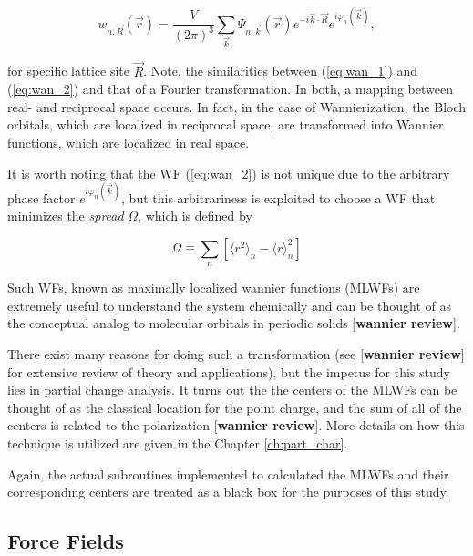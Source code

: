     \begin{equation}
    \label{eq:wan_2}
        w_{n,\vec{R}}(\Vec{r}) = \frac{V}{(2\pi)^3} \sum\limits_{\Vec{k}}  \Psi_{n,\vec{k}}(\Vec{r}) e^{-i\Vec{k}\cdot\Vec{R}} e^{i\varphi_n(\vec{k})},
    \end{equation}
    
    \noindent for specific lattice site $\vec{R}$. Note, the similarities between (\ref{eq:wan_1}) and (\ref{eq:wan_2}) and that of a Fourier transformation. In both, a mapping between real- and reciprocal space occurs. In fact, in the case of Wannierization, the Bloch orbitals, which are localized in reciprocal space, are transformed into Wannier functions, which are localized in real space.
    
    It is worth noting that the WF (\ref{eq:wan_2}) is not unique due to the arbitrary phase factor $e^{i\varphi_n(\vec{k})}$, but this arbitrariness is exploited to choose a WF that minimizes the \textit{spread} $\Omega$, which is defined by
    
    \begin{equation}
        \Omega \equiv \sum\limits_n \left[ \langle r^2 \rangle_n - \langle r \rangle^2_n \right]
    \end{equation}
    
    \noindent Such WFs, known as maximally localized wannier functions (MLWFs) are extremely useful to understand the system chemically and can be thought of as the conceptual analog to molecular orbitals in periodic solids [\textbf{wannier review}].
    
    
    There exist many reasons for doing such a transformation (see [\textbf{wannier review}] for extensive review of theory and applications), but the impetus for this study lies in partial change analysis. It turns out the the centers of the MLWFs can be thought of as the classical location for the point charge, and the sum of all of the centers is related to the polarization [\textbf{wannier review}]. More details on how this technique is utilized are given in the Chapter \ref{ch:part_char}.
    
    Again, the actual subroutines implemented to calculated the MLWFs and their corresponding centers are treated as a black box for the purposes of this study.
    
    \subsection{Force Fields}
    
